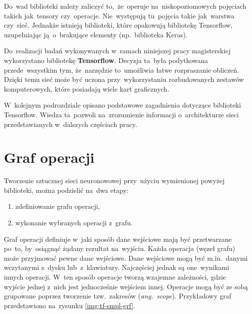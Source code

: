Do~wad biblioteki należy zaliczyć to,~że~operuje na~niskopoziomowych pojęciach takich jak~tensory czy~operacje.
Nie~występują tu~pojęcia takie jak~warstwa czy~sieć. Jednakże istnieją biblioteki, które opakowują bibliotekę
Tensorflow, uzupełniając ją~o~brakujące elementy (np.~biblioteka Keras).

Do~realizacji badań wykonywanych w~ramach niniejszej pracy magisterskiej wykorzystano bibliotekę \textbf{Tensorflow}.
Decyzja ta~była podytkowana przede~wszystkim tym, że~narzędzie to~umożliwia łatwe rozpraszanie obliczeń. Dzięki temu
sieć może być uczona przy~wykorzystaniu rozbudowanych zestawów komputerowych, które posiadają wiele kart graficznych.

W~kolejnym podrozdziale opisano podstawowe zagadnienia dotyczące biblioteki Tensorflow. Wiedza ta~pozwoli na~zrozumienie
informacji o~architekturze sieci przedstawianych w~dalszych częściach pracy.

\section{Graf operacji} \label{sec:graf-operacji}
\begin{minipage}[t]{\textwidth}
    Tworzenie sztucznej sieci neuronowowej przy~użyciu wymienionej powyżej biblioteki, można podzielić na~dwa etapy:
    \begin{enumerate}
        \item zdefiniowanie grafu operacji,
        \item wykonanie wybranych operacji z~grafu.
    \end{enumerate}
\end{minipage}

Graf operacji definiuje w~jaki sposób dane wejściowe mają być przetwarzane po~to, by~osiągnąć żądany rezultat
na~wyjściu. Każda operacja (węzeł grafu) może przyjmować pewne dane wejściowe. Dane wejściowe mogą być m.in.~danymi
wczytanymi z~dysku lub~z~klawiatury. Najczęściej jednak są one~wynikami innych operacji. W~ten sposób operacje tworzą
wzajemne zależności, gdzie wyjście jednej z~nich jest jednocześnie wejściem innej. Operacje mogą być ze sobą grupowane
poprzez tworzenie tzw.~zakresów (\textit{ang.~scope}). Przykładowy graf przedstawiono na~rysunku \ref{img:tf-smpl-grf}.

